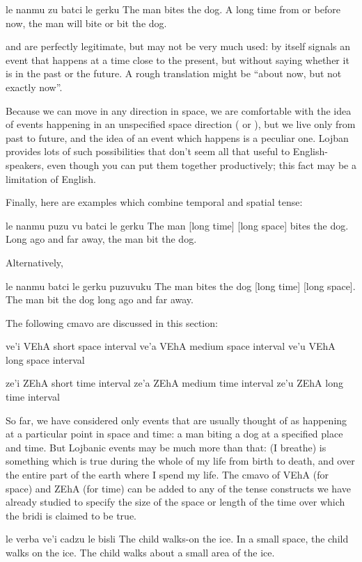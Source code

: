 \begin{example}
le nanmu zu batci le gerku\n
The man  bites the dog.\n
A long time from or before now,\n
\T	the man will bite or bit the dog.
\end{example}

 and  are perfectly legitimate, but may not be very much
    used:  by itself signals an event that happens at a time
    close to the present, but without saying whether it is in the
    past or the future. A rough translation might be ``about now,
    but not exactly now''. 

Because we can move in any direction in space, we are
    comfortable with the idea of events happening in an unspecified
    space direction ( or ), but we live only
    from past to future, and the idea of an event which happens
     is a peculiar one. Lojban provides lots of
    such possibilities that don't seem all that useful to
    English-speakers, even though you can put them together
    productively; this fact may be a limitation of English.

Finally, here are examples which combine temporal and
    spatial tense:
\begin{example}
le nanmu puzu vu batci le gerku\n
The man  [long time] [long space] bites the dog.\n
Long ago and far away, the man bit the dog.
\end{example}

Alternatively,
\begin{example}
le nanmu batci le gerku puzuvuku\n
The man bites the dog  [long time] [long space].\n
The man bit the dog long ago and far away.
\end{example}



The following cmavo are discussed in this section:

   ve'i    VEhA    short space interval
    ve'a    VEhA    medium space interval
    ve'u    VEhA    long space interval

ze'i    ZEhA    short time interval
    ze'a    ZEhA    medium time interval
    ze'u    ZEhA    long time interval

So far, we have considered only events that are usually thought
    of as happening at a particular point in space and time: a man
    biting a dog at a specified place and time. But Lojbanic events
    may be much more  than that:  (I
    breathe) is something which is true during the whole of my life
    from birth to death, and over the entire part of the earth
    where I spend my life. The cmavo of VEhA (for space) and ZEhA
    (for time) can be added to any of the tense constructs we have
    already studied to specify the size of the space or length of
    the time over which the bridi is claimed to be true.
\begin{example}
le verba ve'i cadzu le bisli\n
The child  walks-on the ice.\n
In a small space, the child walks on the ice.\n
The child walks about a small area of the ice.
\end{example}

